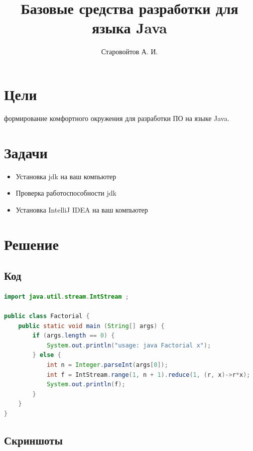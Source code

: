 \documentclass{iu9lab}
\title{Базовые средства разработки для языка Java}
\author{Старовойтов А. И.}
\begin{document}
\maketitle

\section{Цели}

формирование комфортного окружения для разработки ПО на языке Java.

\section{Задачи}

\begin{itemize}
  \item
        Установка jdk на ваш компьютер
  \item
        Проверка работоспособности jdk
  \item
        Установка IntelliJ IDEA на ваш компьютер
\end{itemize}

\section{Решение}

\subsection{Код}

\begin{lstlisting}[language=java]
import java.util.stream.IntStream ;

public class Factorial {
    public static void main (String[] args) {
        if (args.length == 0) {
            System.out.println("usage: java Factorial x");
        } else {
            int n = Integer.parseInt(args[0]);
            int f = IntStream.range(1, n + 1).reduce(1, (r, x)->r*x);
            System.out.println(f);
        }
    }
}
\end{lstlisting}

\subsection{Скриншоты}
\end{document}

